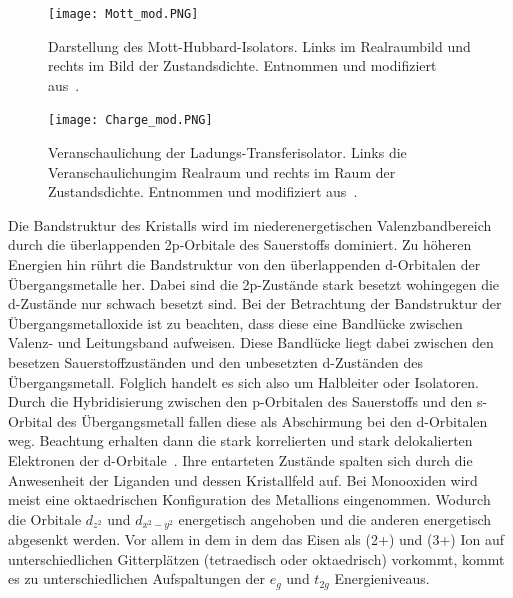         \begin{figure}
            \centering
            \texttt{[image: Mott\_mod.PNG]}
            \caption{Darstellung des Mott-Hubbard-Isolators. Links im Realraumbild und rechts im Bild der Zustandsdichte.
            Entnommen und modifiziert aus~\cite{stohr_magnetism_2006}.}
            \label{fig:Mott}
        \end{figure}
        \begin{figure}
            \centering
            \texttt{[image: Charge\_mod.PNG]}
            \caption{Veranschaulichung der Ladungs-Transferisolator. Links die Veranschaulichungim Realraum und rechts im Raum der Zustandsdichte.
            Entnommen und modifiziert aus~\cite{stohr_magnetism_2006}.}
            \label{fig:Charge}
        \end{figure}
        Die Bandstruktur des Kristalls wird im niederenergetischen Valenzbandbereich durch die überlappenden 2p-Orbitale des Sauerstoffs dominiert.
        Zu höheren Energien hin rührt die Bandstruktur von den überlappenden d-Orbitalen der Übergangsmetalle her.
        Dabei sind die 2p-Zustände stark besetzt wohingegen die d-Zustände nur schwach besetzt sind.
        Bei der Betrachtung der Bandstruktur der Übergangsmetalloxide ist zu beachten, dass diese eine Bandlücke zwischen Valenz- und Leitungsband aufweisen.
        Diese Bandlücke liegt dabei zwischen den besetzen Sauerstoffzuständen und den unbesetzten d-Zuständen des Übergangsmetall.
        Folglich handelt es sich also um Halbleiter oder Isolatoren.
        Durch die Hybridisierung zwischen den p-Orbitalen des Sauerstoffs und den s-Orbital des Übergangsmetall fallen diese als Abschirmung bei den d-Orbitalen weg.
        Beachtung erhalten dann die stark korrelierten und stark delokalierten Elektronen der d-Orbitale~\cite{dane_beschreibung_2008}.
        Ihre entarteten Zustände spalten sich durch die Anwesenheit der Liganden und dessen Kristallfeld auf.
        Bei Monooxiden wird meist eine oktaedrischen Konfiguration des Metallions eingenommen.
        Wodurch die Orbitale $d_{z^2}$ und $d_{x^2-y^2}$ energetisch angehoben und die anderen energetisch abgesenkt werden.
        Vor allem in dem  in dem das Eisen als (2+) und (3+) Ion auf unterschiedlichen Gitterplätzen (tetraedisch oder oktaedrisch) vorkommt, kommt es zu unterschiedlichen Aufspaltungen der $e_g$ und $t_{2g}$ Energieniveaus.
        
